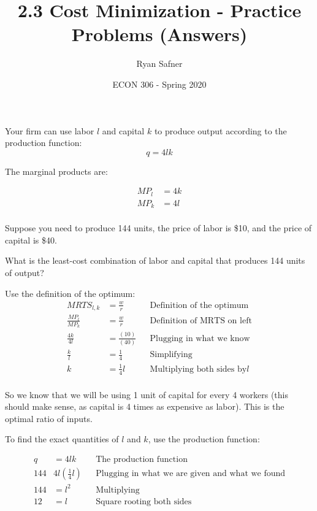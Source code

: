 \documentclass[12 pt]{exam}
\title{2.3 Cost Minimization - Practice Problems (Answers)}
\author{Ryan Safner}
\date{ECON 306 - Spring 2020}
\begin{document}
\maketitle

Your firm can use labor $l$ and capital $k$ to produce output according to the production function:
$$q=4lk$$


The marginal products are:

$$\begin{aligned}
MP_l &=4k \\
MP_k &=4l \\ \end{aligned}$$

Suppose you  need to produce 144 units, the price of labor is \$10, and the price of capital is \$40. 

\begin{questions}

\question What is the least-cost combination of labor and capital that produces 144 units of output?

  \begin{solution}
  	Use the definition of the optimum: 
\begin{align*}
MRTS_{l,k}&=\frac{w}{r} & & \text{Definition of the optimum}\\
\frac{MP_l}{MP_k}&=\frac{w}{r} && \text{Definition of MRTS on left}\\
\frac{4k}{4l} &=\frac{(10)}{(40)} & & \text{Plugging in what we know}\\
		\frac{k}{l}&=\frac{1}{4} && \text{Simplifying}\\
	k&=\frac{1}{4}l && \text{Multiplying both sides by} l\\	
\end{align*}

So we know that we will be using 1 unit of capital for every 4 workers (this should make sense, as capital is 4 times as expensive as labor). This is the optimal ratio of inputs. 

To find the exact quantities of $l$ and $k$, use the production function:

\begin{align*}
q&=4lk & & \text{The production function}\\
144&4l(\frac{1}{4}l) & & \text{Plugging in what we are given and what we found}\\
144&=l^2 & & \text{Multiplying}\\
12&=l & & \text{Square rooting both sides}\\
\end{align*}


\end{solution}
\end{questions}
\end{document}
